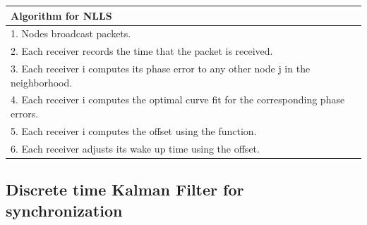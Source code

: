 \documentclass[a4paper,10pt]{report}
\begin{document}
\newline
\begin{tabular}{  l }Algorithm for NLLS \\\hline \hline
1. Nodes broadcast packets. \\  2. Each receiver records the time that the packet is received. \\
3. Each receiver i computes its phase error to any other node j in the neighborhood. \\
4. Each receiver i computes the optimal curve fit for the corresponding phase errors. \\
5. Each receiver i computes the offset using the function. \\
6. Each receiver adjusts its wake up time using the offset.\\
\hline \hline
\end{tabular}
\subsection{\textbf{Discrete time Kalman Filter for synchronization}}
\end{document}
